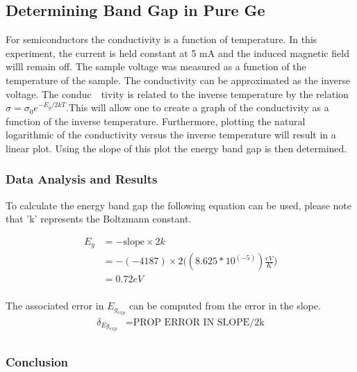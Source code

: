 \documentclass[a4paper]{article}
\begin{document}
\subsection{Determining Band Gap in Pure Ge}

\qq For semiconductors the conductivity is a function of
temperature. In this experiment, the current is held constant at 5 mA
and the induced magnetic field willl remain off. The sample voltage
was measured as a function of the temperature of the sample. The
conductivity can be approximated as the inverse voltage. The
conduc\ \ tivity is related to the inverse temperature by the relation
$\sigma = \sigma_0 e^{-E_g/2kT}$.This will allow one to create a graph
of the conductivity as a function of the inverse
temperature. Furthermore, plotting the natural logarithmic of the
conductivity versus the inverse temperature will result in a linear
plot. Using the slope of this plot the energy band gap is then
determined.

\subsubsection{Data Analysis and Results}
\qq To calculate the energy band gap the following equation can be
used, please note that 'k' represents the Boltzmann constant.

\begin{align*}
E_g &= - \text{slope} \times 2k \\
    &= - (-4187) \times 2
       \Big(( 8.625 * 10^(-5)) \frac{eV}{K} \Big) \\
    &= 0.72 eV \\
\end{align*}



The associated error in $E_{g_{exp}}$ can be computed from the error in the slope.
\begin{align*}
\delta_{Eg_{exp}} &= \text{PROP ERROR IN SLOPE/2k} \\
\end{align*}


\subsubsection{Conclusion}
\end{document}
